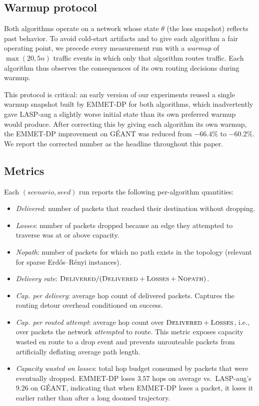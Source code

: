 \subsection{Warmup protocol}
\label{subsec:warmup}

Both algorithms operate on a network whose state $\theta$ (the loss
snapshot) reflects past behavior. To avoid cold-start artifacts and to
give each algorithm a fair operating point, we precede every
measurement run with a \emph{warmup} of $\max(20, 5n)$ traffic events
in which only that algorithm routes traffic. Each algorithm thus
observes the consequences of its own routing decisions during warmup.

This protocol is critical: an early version of our experiments
reused a single warmup snapshot built by EMMET-DP for both
algorithms, which inadvertently gave LASP-aug a slightly worse
initial state than its own preferred warmup would produce. After
correcting this by giving each algorithm its own warmup, the
EMMET-DP improvement on GÉANT was reduced from $-66.4\%$ to
$-60.2\%$. We report the corrected number as the headline
throughout this paper.

\subsection{Metrics}
\label{subsec:metrics}

Each $(scenario, seed)$ run reports the following per-algorithm
quantities:

\begin{itemize}
\item \emph{Delivered}: number of packets that reached their
destination without dropping.
\item \emph{Losses}: number of packets dropped because an edge they
attempted to traverse was at or above capacity.
\item \emph{Nopath}: number of packets for which no path exists in
the topology (relevant for sparse Erd\H{o}s--R\'enyi instances).
\item \emph{Delivery rate}: \(\textsc{Delivered} / (\textsc{Delivered} +
\textsc{Losses} + \textsc{Nopath})\).
\item \emph{Cap. per delivery}: average hop count of delivered
packets. Captures the routing detour overhead conditioned on success.
\item \emph{Cap. per routed attempt}: average hop count over
$\textsc{Delivered}+\textsc{Losses}$, i.e., over packets the network
\emph{attempted} to route. This metric exposes capacity wasted en route to a drop event and prevents
unrouteable packets from artificially deflating average path length.
\item \emph{Capacity wasted on losses}: total hop budget consumed by
packets that were eventually dropped. EMMET-DP loses $3.57$ hops
on average vs.\ LASP-aug's $9.26$ on GÉANT, indicating that when
EMMET-DP loses a packet, it loses it earlier rather than after a
long doomed trajectory.
\end{itemize}

